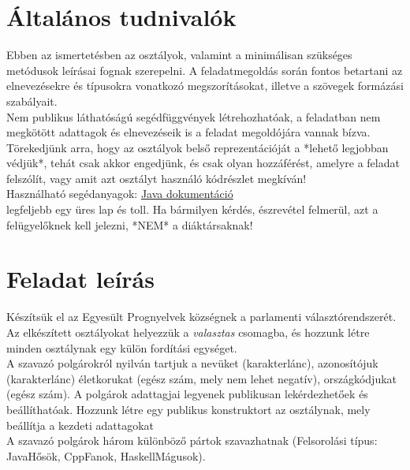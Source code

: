 \documentclass[12pt,a4paper]{article}
\begin{document}
\section{Általános tudnivalók}

Ebben az ismertetésben az osztályok, valamint a minimálisan szükséges
metódusok leírásai fognak szerepelni.  A feladatmegoldás során fontos
betartani az elnevezésekre és típusokra vonatkozó megszorításokat, illetve
a szövegek formázási szabályait. \\

Nem publikus láthatóságú segédfüggvények létrehozhatóak, a feladatban nem
megkötött adattagok és elnevezéseik is a feladat megoldójára vannak bízva.
Törekedjünk arra, hogy az osztályok belső reprezentációját a *lehető
legjobban védjük*, tehát csak akkor engedjünk, és csak olyan hozzáférést,
amelyre a feladat felszólít, vagy amit azt osztályt használó kódrészlet
megkíván! \\ 

Használható segédanyagok:
\href{https://bead.inf.elte.hu/files/java/api/index.html}{Java dokumentáció} \\
legfeljebb egy üres lap és toll.  Ha bármilyen kérdés, észrevétel felmerül,
azt a felügyelőknek kell jelezni, *NEM* a diáktársaknak!


\section{Feladat leírás}

Készítsük el az Egyesült Prognyelvek községnek a parlamenti választórendszerét. Az elkészített osztályokat helyezzük a \textit{valasztas} csomagba, és hozzunk létre minden osztálynak egy külön fordítási egységet. \\
 
A szavazó polgárokról nyilván tartjuk a nevüket (karakterlánc), azonosítójuk (karakterlánc) életkorukat (egész szám, mely nem lehet negatív), országkódjukat (egész szám). A polgárok adattagjai legyenek publikusan lekérdezhetőek és beállíthatóak. Hozzunk létre egy publikus konstruktort az osztálynak, mely beállítja a kezdeti adattagokat \\ 
A szavazó polgárok három különböző pártok szavazhatnak (Felsorolási típus: JavaHősök, CppFanok, HaskellMágusok). \\
\end{document}
